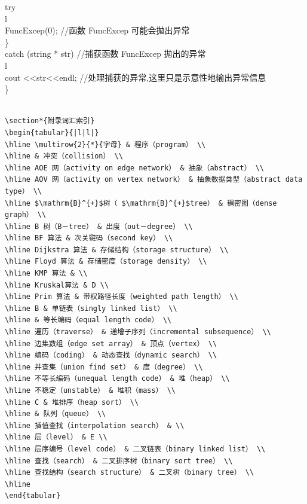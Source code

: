 \documentclass[10pt]{article}
\begin{document}
try\\
l\\
FuncExcep(0); //函数 FuncExcep 可能会拋出异常\\
\}\\
catch (string * str) //捕获函数 FuncExcep 拋出的异常\\
l\\
cout <<str<<endl; //处理捕获的异常,这里只是示意性地输出异常信息\\
\}

\begin{verbatim}

\section*{附录词汇索引}
\begin{tabular}{|l|l|}
\hline \multirow{2}{*}{字母} & 程序（program） \\
\hline & 冲突（collision） \\
\hline AOE 网（activity on edge network） & 抽象（abstract） \\
\hline AOV 网（activity on vertex network） & 抽象数据类型（abstract data type） \\
\hline $\mathrm{B}^{+}$树（ $\mathrm{B}^{+}$tree） & 稠密图（dense graph） \\
\hline B 树（B－tree） & 出度（out－degree） \\
\hline BF 算法 & 次关键码（second key） \\
\hline Dijkstra 算法 & 存储结构（storage structure） \\
\hline Floyd 算法 & 存储密度（storage density） \\
\hline KMP 算法 & \\
\hline Kruskal算法 & D \\
\hline Prim 算法 & 带权路径长度（weighted path length） \\
\hline B & 单链表（singly linked list） \\
\hline & 等长编码（equal length code） \\
\hline 遍历（traverse） & 递增子序列（incremental subsequence） \\
\hline 边集数组（edge set array） & 顶点（vertex） \\
\hline 编码（coding） & 动态查找（dynamic search） \\
\hline 并查集（union find set） & 度（degree） \\
\hline 不等长编码（unequal length code） & 堆（heap） \\
\hline 不稳定（unstable） & 堆积（mass） \\
\hline C & 堆排序（heap sort） \\
\hline & 队列（queue） \\
\hline 插值查找（interpolation search） & \\
\hline 层（level） & E \\
\hline 层序编号（level code） & 二叉链表（binary linked list） \\
\hline 查找（search） & 二叉排序树（binary sort tree） \\
\hline 查找结构（search structure） & 二叉树（binary tree） \\
\hline
\end{tabular}


\end{verbatim}
\end{document}
